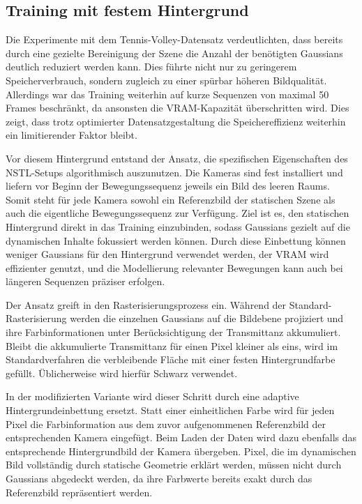 \subsection{Training mit festem Hintergrund}




Die Experimente mit dem Tennis-Volley-Datensatz verdeutlichten, dass bereits durch eine gezielte Bereinigung der Szene die Anzahl der benötigten Gaussians deutlich reduziert werden kann. 
Dies führte nicht nur zu geringerem Speicherverbrauch, sondern zugleich zu einer spürbar höheren Bildqualität. 
Allerdings war das Training weiterhin auf kurze Sequenzen von maximal 50 Frames beschränkt, da ansonsten die VRAM-Kapazität überschritten wird. 
Dies zeigt, dass trotz optimierter Datensatzgestaltung die Speichereffizienz weiterhin ein limitierender Faktor bleibt. 

Vor diesem Hintergrund entstand der Ansatz, die spezifischen Eigenschaften des NSTL-Setups algorithmisch auszunutzen.
Die Kameras sind fest installiert und liefern vor Beginn der Bewegungssequenz jeweils ein Bild des leeren Raums. 
Somit steht für jede Kamera sowohl ein Referenzbild der statischen Szene als auch die eigentliche Bewegungssequenz zur Verfügung. 
Ziel ist es, den statischen Hintergrund direkt in das Training einzubinden, sodass Gaussians gezielt auf die dynamischen Inhalte fokussiert werden können. 
Durch diese Einbettung können weniger Gaussians für den Hintergrund verwendet werden, der VRAM wird effizienter genutzt, und die Modellierung relevanter Bewegungen kann auch bei längeren Sequenzen präziser erfolgen. 

Der Ansatz greift in den Rasterisierungsprozess ein. 
Während der Standard-Rasterisierung werden die einzelnen Gaussians auf die Bildebene projiziert und ihre Farbinformationen unter Berücksichtigung der Transmittanz akkumuliert. 
Bleibt die akkumulierte Transmittanz für einen Pixel kleiner als eins, wird im Standardverfahren die verbleibende Fläche mit einer festen Hintergrundfarbe gefüllt. 
Üblicherweise wird hierfür Schwarz verwendet.

In der modifizierten Variante wird dieser Schritt durch eine adaptive Hintergrundeinbettung ersetzt. 
Statt einer einheitlichen Farbe wird für jeden Pixel die Farbinformation aus dem zuvor aufgenommenen Referenzbild der entsprechenden Kamera eingefügt. 
Beim Laden der Daten wird dazu ebenfalls das entsprechende Hintergrundbild der Kamera übergeben.
Pixel, die im dynamischen Bild vollständig durch statische Geometrie erklärt werden, müssen nicht durch Gaussians abgedeckt werden, da ihre Farbwerte bereits exakt durch das Referenzbild repräsentiert werden. 

